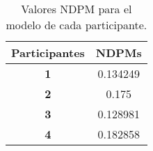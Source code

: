 \begin{table}[H]
    \begin{center}
        \begin{tabular}{|c|c|}
            \hline
            \rowcolor{Cyan} 
            \textbf{Participantes} & \textbf{NDPMs} \\ 
            \hline
            \textbf{1} & 0.134249 \\
            \hline
            \rowcolor{GrisTabla}
            \textbf{2} & 0.175 \\
            \hline
            \textbf{3} & 0.128981 \\
            \hline
            \rowcolor{GrisTabla}
            \textbf{4} & 0.182858 \\
            \hline
        \end{tabular}
        \caption{\centering Valores NDPM para el modelo de cada participante.}\label{tab:NDPM_PARTICIPANTES}
    \end{center}    
\end{table}

